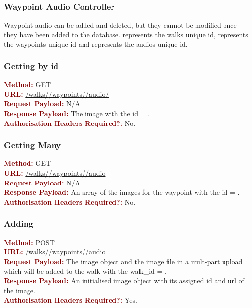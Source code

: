 \documentclass[11pt,a4paper]{report}
\begin{document}
\subsubsection{Waypoint Audio Controller}
Waypoint audio can be added and deleted, but they cannot be modified once they have been added to the database.  represents the walks unique id,  represents the waypoints unique id and  represents the audios unique id. 

\subsubsection{Getting by id}
\textbf{\textcolor{Maroon}{Method:}} GET\\
\textbf{\textcolor{Maroon}{URL:}} \url{/walks/}\url{/waypoints/}\url{/audio/}\\
\textbf{\textcolor{Maroon}{Request Payload:}} N/A\\
\textbf{\textcolor{Maroon}{Response Payload:}} The image with the id = .\\
\textbf{\textcolor{Maroon}{Authorisation Headers Required?:}} No.

\subsubsection{Getting Many}
\textbf{\textcolor{Maroon}{Method:}} GET\\
\textbf{\textcolor{Maroon}{URL:}} \url{/walks/}\url{/waypoints/}\url{/audio}\\
\textbf{\textcolor{Maroon}{Request Payload:}} N/A\\
\textbf{\textcolor{Maroon}{Response Payload:}} An array of the images for the waypoint with the id = .\\
\textbf{\textcolor{Maroon}{Authorisation Headers Required?:}} No.

\subsubsection{Adding}
\textbf{\textcolor{Maroon}{Method:}} POST\\
\textbf{\textcolor{Maroon}{URL:}} \url{/walks/}\url{/waypoints/}\url{/audio}\\
\textbf{\textcolor{Maroon}{Request Payload:}} The image object and the image file in a mult-part upload which will be added to the walk with the walk\_id = .\\
\textbf{\textcolor{Maroon}{Response Payload:}} An initialised image object with its assigned id and url of the image.\\
\textbf{\textcolor{Maroon}{Authorisation Headers Required?:}} Yes.
\end{document}
